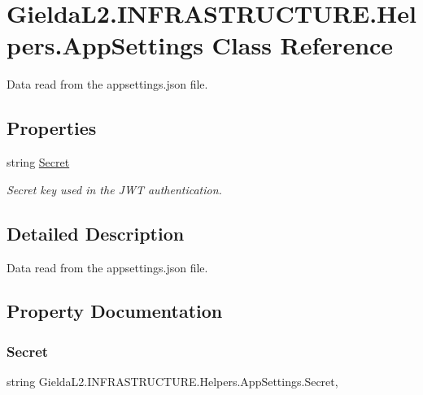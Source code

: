 \hypertarget{class_gielda_l2_1_1_i_n_f_r_a_s_t_r_u_c_t_u_r_e_1_1_helpers_1_1_app_settings}{}\section{Gielda\+L2.\+I\+N\+F\+R\+A\+S\+T\+R\+U\+C\+T\+U\+R\+E.\+Helpers.\+App\+Settings Class Reference}
\label{class_gielda_l2_1_1_i_n_f_r_a_s_t_r_u_c_t_u_r_e_1_1_helpers_1_1_app_settings}


Data read from the appsettings.\+json file.  


\subsection*{Properties}
\begin{DoxyCompactItemize}
\item 
string \mbox{\hyperlink{class_gielda_l2_1_1_i_n_f_r_a_s_t_r_u_c_t_u_r_e_1_1_helpers_1_1_app_settings_aebbae35a4ed65caa414e02a21ea5d3b0}{Secret}}
\begin{DoxyCompactList}\small\item\em Secret key used in the J\+WT authentication. \end{DoxyCompactList}\end{DoxyCompactItemize}


\subsection{Detailed Description}
Data read from the appsettings.\+json file. 



\subsection{Property Documentation}
\mbox{\label{class_gielda_l2_1_1_i_n_f_r_a_s_t_r_u_c_t_u_r_e_1_1_helpers_1_1_app_settings_aebbae35a4ed65caa414e02a21ea5d3b0}} 
\subsubsection{\texorpdfstring{Secret}{Secret}}
{\footnotesize\ttfamily string Gielda\+L2.\+I\+N\+F\+R\+A\+S\+T\+R\+U\+C\+T\+U\+R\+E.\+Helpers.\+App\+Settings.\+Secret\hspace{0.3cm}{\ttfamily [get]}, {\ttfamily [set]}}



